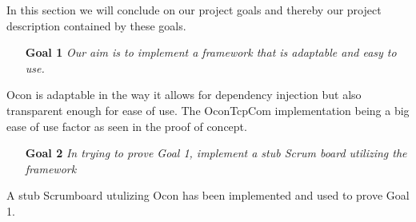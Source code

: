 \documentclass[../report.tex]{subfiles}
\begin{document}
\graphicspath{{img/}{../img/}}


In this section we will conclude on our project goals and thereby our project description contained by these goals.\\

\begin{itemize}
\item[\textbf{Goal 1}] \textit{Our aim is to implement a framework that is adaptable and easy to use.}
\end{itemize}

Ocon is adaptable in the way it allows for dependency injection but also transparent enough for ease of use. The OconTcpCom implementation being a big ease of use factor as seen in the proof of concept. \\
 
\begin{itemize}
\item[\textbf{Goal 2}] \textit{In trying to prove Goal 1, implement a stub Scrum board utilizing the framework}
\end{itemize}
A stub Scrumboard utulizing Ocon has been implemented and used to prove Goal 1.
 
\end{document}
